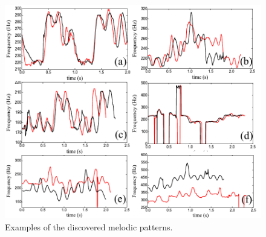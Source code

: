 \begin{figure}
	\begin{center}
		\includegraphics[width=\figSizeHundred]{ch06_patterns/figures/discovery/combinedPatterns.pdf}
	\end{center}
	\caption{Examples of the discovered melodic patterns.}
	\label{fig:combinedPatternsDiscovered}
\end{figure}


